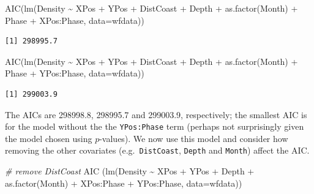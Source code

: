 \documentclass[
  oneside]{krantz}
\newenvironment{Shaded}{\begin{snugshade}}{\end{snugshade}}
\newcommand{\AttributeTok}[1]{\textcolor[rgb]{0.77,0.63,0.00}{#1}}
\newcommand{\CommentTok}[1]{\textcolor[rgb]{0.56,0.35,0.01}{\textit{#1}}}
\newcommand{\FunctionTok}[1]{\textcolor[rgb]{0.00,0.00,0.00}{#1}}
\newcommand{\NormalTok}[1]{#1}
\newcommand{\SpecialCharTok}[1]{\textcolor[rgb]{0.00,0.00,0.00}{#1}}
\begin{document}
\begin{Shaded}
\begin{Highlighting}[]
\FunctionTok{AIC}\NormalTok{(}\FunctionTok{lm}\NormalTok{(Density }\SpecialCharTok{\textasciitilde{}}\NormalTok{ XPos }\SpecialCharTok{+}\NormalTok{ YPos }\SpecialCharTok{+}\NormalTok{ DistCoast }\SpecialCharTok{+}\NormalTok{ Depth }\SpecialCharTok{+} \FunctionTok{as.factor}\NormalTok{(Month) }\SpecialCharTok{+}  
\NormalTok{                     Phase }\SpecialCharTok{+}\NormalTok{ XPos}\SpecialCharTok{:}\NormalTok{Phase, }\AttributeTok{data=}\NormalTok{wfdata))}
\end{Highlighting}
\end{Shaded}

\begin{verbatim}
[1] 298995.7
\end{verbatim}

\begin{Shaded}
\begin{Highlighting}[]
\FunctionTok{AIC}\NormalTok{(}\FunctionTok{lm}\NormalTok{(Density }\SpecialCharTok{\textasciitilde{}}\NormalTok{ XPos }\SpecialCharTok{+}\NormalTok{ YPos }\SpecialCharTok{+}\NormalTok{ DistCoast }\SpecialCharTok{+}\NormalTok{ Depth }\SpecialCharTok{+} \FunctionTok{as.factor}\NormalTok{(Month) }\SpecialCharTok{+}  
\NormalTok{                     Phase }\SpecialCharTok{+}\NormalTok{ YPos}\SpecialCharTok{:}\NormalTok{Phase, }\AttributeTok{data=}\NormalTok{wfdata))}
\end{Highlighting}
\end{Shaded}

\begin{verbatim}
[1] 299003.9
\end{verbatim}

\normalsize

The AICs are 298998.8, 298995.7 and 299003.9, respectively; the smallest AIC is for the model without the the \texttt{YPos:Phase} term (perhaps not surprisingly given the model chosen using \(p\)-values). We now use this model and consider how removing the other covariates (e.g.~\texttt{DistCoast}, \texttt{Depth} and \texttt{Month}) affect the AIC.

\small

\begin{Shaded}
\begin{Highlighting}[]
\CommentTok{\# remove DistCoast}
\FunctionTok{AIC}\NormalTok{ (}\FunctionTok{lm}\NormalTok{(Density }\SpecialCharTok{\textasciitilde{}}\NormalTok{ XPos }\SpecialCharTok{+}\NormalTok{ YPos }\SpecialCharTok{+}\NormalTok{ Depth }\SpecialCharTok{+} \FunctionTok{as.factor}\NormalTok{(Month) }\SpecialCharTok{+} 
\NormalTok{          XPos}\SpecialCharTok{:}\NormalTok{Phase }\SpecialCharTok{+}\NormalTok{ YPos}\SpecialCharTok{:}\NormalTok{Phase, }\AttributeTok{data=}\NormalTok{wfdata))}
\end{Highlighting}
\end{Shaded}
\end{document}
